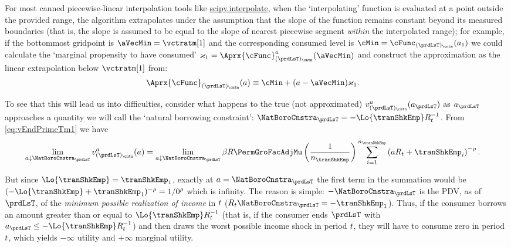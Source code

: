 \documentclass[SolvingMicroDSOPs]{subfiles}
\begin{document}
For most canned piecewise-linear interpolation tools like \href{https://docs.scipy.org/doc/scipy/tutorial/interpolate.html}{scipy.interpolate}, when the `interpolating' function is evaluated at a point outside the provided range, the algorithm extrapolates under the assumption that the slope of the function remains constant beyond its measured boundaries (that is, the slope is assumed to be equal to the slope of nearest piecewise segment \emph{within} the interpolated range); for example, if the bottommost gridpoint is $\aVecMin = \vctratm[1]$ and the corresponding consumed level is $\cMin = \cFunc_{(\prdLsT)_\cntn}(a_1)$ we could calculate the `marginal propensity to have consumed' $\varkappa_{1}=
\Aprx{\cFunc}_{(\prdLsT)_\cntn}^{a}(\aVecMin)$ and construct the approximation as the linear extrapolation below $\vctratm[1]$ from:
\begin{equation}\begin{gathered}\begin{aligned}
      \Aprx{\cFunc}_{(\prdLsT)_\cntn}(a)  &  \equiv \cMin + (a-\aVecMin)\varkappa_{1}  \label{eq:ExtrapLin}.
    \end{aligned}\end{gathered}\end{equation}

To see that this will lead us into difficulties, consider what happens to the true (not approximated) $\vFunc^{a}_{(\prdLsT)_\cntn}(a_{\prdLsT})$ as $a_{\prdLsT}$ approaches a quantity we will call the `natural borrowing constraint': $\NatBoroCnstra_{\prdLsT}=-\Lo{\tranShkEmp}\RNrm_{\prdT}^{-1}$.  From
\eqref{eq:vEndPrimeTm1} we have
\begin{equation}\begin{gathered}\begin{aligned}
      \lim_{\aNrm \downarrow \NatBoroCnstra_{\prdLsT}} \vFunc^{a}_{(\prdLsT)_\cntn}(\aNrm)
      & =                                                                                         \lim_{\aNrm \downarrow \NatBoroCnstra_{\prdLsT}} \DiscFac \Rfree \PermGroFacAdjMu \left(\frac{1}{n_{\tranShkEmp}}\right) \sum_{i=1}^{n_{\tranShkEmp}} \left( \aNrm \RNrm_{\prd}+ \tranShkEmp_{i}\right)^{-\CRRA}.
    \end{aligned}\end{gathered}\end{equation}

But since $\Lo{\tranShkEmp}=\tranShkEmp_{1}$, exactly at $\aNrm=\NatBoroCnstra_{\prdLsT}$ the first term in the summation would be $(-\Lo{\tranShkEmp}+\tranShkEmp_{1})^{-\CRRA}=1/0^{\CRRA}$ which is infinity.  The reason is simple: $-\NatBoroCnstra_{\prdLsT}$ is the PDV, as of $\prdLsT$, of the \emph{minimum possible realization of income} in $t$ ($\RNrm_{\prdT}\NatBoroCnstra_{\prdLsT} = -\tranShkEmp_{1}$).  Thus, if the consumer borrows an amount greater than or equal to $\Lo{\tranShkEmp}\RNrm_{\prdT}^{-1}$ (that is, if the consumer ends $\prdLsT$ with $a_{\prdLsT} \leq -\Lo{\tranShkEmp}\RNrm_{\prdT}^{-1}$) and then draws the worst possible income shock in period $t$, they will have to consume zero in period $t$, which yields $-\infty$ utility and $+\infty$ marginal utility.
\end{document}
